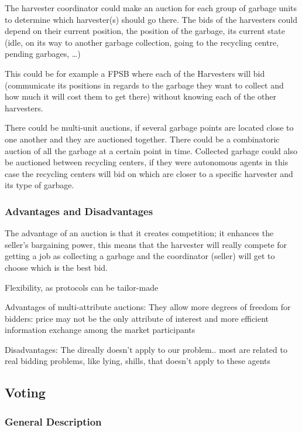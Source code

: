 The harvester coordinator could make an auction for each group of garbage units to determine which harvester(s) should go there. The bids of the harvesters could depend on their current position, the position of the garbage, its current state (idle, on its way to another garbage collection, going to the recycling centre, pending garbages, …)

This could be for example a FPSB where each of the Harvesters will bid (communicate its positions in regards to the garbage they want to  collect and how much it will cost them to get there) without knowing each of the other harvesters.

There could be multi-unit auctions, if several garbage points are located close to one another and they are auctioned together.
There could be a combinatoric auction of all the garbage at a certain point in time.
Collected garbage could also be auctioned between recycling centers, if they were autonomous agents in this case the recycling centers will bid on which are closer to a specific harvester and its type of garbage.

\subsubsection{Advantages and Disadvantages}

The advantage of an auction is that it creates competition; it enhances the seller’s bargaining power, this means that the harvester will really compete for getting a job as collecting a garbage and the coordinator (seller) will get to choose which is the best bid.

Flexibility, as protocols can be tailor-made

Advantages of multi-attribute auctions: They allow more degrees of freedom for bidders: price may not be the only attribute of interest and more efficient information exchange among the market participants

Disadvantages:
The direally doesn't apply to our problem.. most are related to real bidding problems, like lying, shills, that doesn't apply to these agents



\subsection{Voting}

\subsubsection{General Description}

